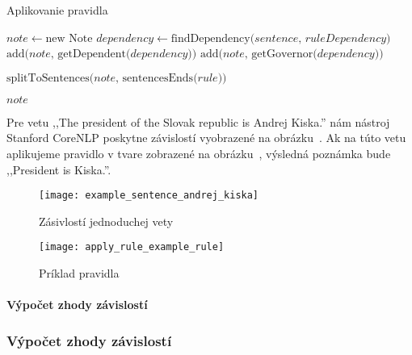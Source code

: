 \begin{algorithm}
	\caption[Aplikovanie pravidla]{Aplikovanie pravidla}\label{alg:applying_rule}
	\begin{algorithmic}[1]
		\State $note \gets \text{new Note}$
		\State $dependency \gets \text{findDependency(} sentence \text{, } ruleDependency \text{)}$
		\State $\text{add(} note \text{, getDependent(} dependency \text{))}$
		\State $\text{add(} note \text{, getGovernor(} dependency \text{))}$
		\EndIf
		\EndIf
		\EndFor
		
		\State $\text{splitToSentences(} note \text{, sentencesEnds(} rule \text{))}$	
		
		\Return $note$
		\EndProcedure
	\end{algorithmic}
\end{algorithm}

Pre vetu ,,The president of the Slovak republic is Andrej Kiska.'' nám nástroj Stanford CoreNLP poskytne závislostí vyobrazené na obrázku~. Ak na túto vetu aplikujeme pravidlo v tvare zobrazené na obrázku~, výsledná poznámka bude ,,President is Kiska.''. 

\begin{figure}[H]
	\begin{center}\texttt{[image: example\_sentence\_andrej\_kiska]}\end{center}
	\caption[Zásivlostí jednoduchej vety]{Zásivlostí jednoduchej vety}\label{fig:example_sentence_andrej_kiska}
\end{figure}

\begin{figure}[H]
	\begin{center}\texttt{[image: apply\_rule\_example\_rule]}\end{center}
	\caption[Príklad pravidla]{Príklad pravidla}\label{fig:apply_rule_example_rule}
\end{figure}

%
%
{
	\paragraph{Výpočet zhody závislostí}
}
{
	\subsubsection{Výpočet zhody závislostí}
}
\label{paragraph:dependency_match}

